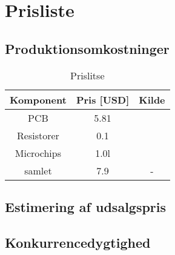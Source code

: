 \section{Prisliste}
\subsection{Produktionsomkostninger}




\begin{table}[H] \label{vores}
	\caption{Prislitse} %
	\centering
		\begin{tabular}{c|c c} 
		
		Komponent & Pris [USD] & Kilde\\ [0.5ex] 
		\hline 
			PCB & 5.81 & \cite{PCB}\\ 
			Resistorer & 0.1&\cite{resistor} \\
			Microchips & 1.0l& \cite{microchip}\\
			samlet & 7.9 & -\\ [1ex]
		\hline %
	\end{tabular}
\end{table}


\subsection{Estimering af udsalgspris}
\subsection{Konkurrencedygtighed}